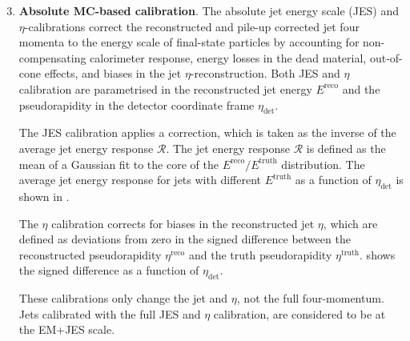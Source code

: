 \begin{enumerate}
	\setcounter{enumi}{2}
	\item \textbf{Absolute MC-based calibration}. The absolute jet energy scale (JES) and \(\eta\)-calibrations correct the reconstructed and pile-up corrected jet four momenta to the energy scale of final-state particles by accounting for non-compensating calorimeter response, energy losses in the dead material, out-of-cone effects, and biases in the jet \(\eta\)-reconstruction. Both JES and \(\eta\) calibration are parametrised in the reconstructed jet energy \(E^{\text{reco}}\) and the pseudorapidity in the detector coordinate frame \(\eta_{\text{det}}\).

	The JES calibration applies a correction, which is taken as the inverse of the average jet energy response \(\mathcal{R}\). The jet energy response \(\mathcal{R}\) is defined as the mean of a Gaussian fit to the core of the \(E^{\text{reco}} / E^{\text{truth}}\) distribution. The average jet energy response for jets with different \(E^{\text{truth}}\) as a function of \(\eta_{\text{det}}\) is shown in .

	The \(\eta\) calibration corrects for biases in the reconstructed jet \(\eta\), which are defined as deviations from zero in the signed difference between the reconstructed pseudorapidity \(\eta^{\text{reco}}\) and the truth pseudorapidity \(\eta^{\text{truth}}\).  shows the signed difference as a function of \(\eta_{\text{det}}\).

	These calibrations only change the jet \pt and \(\eta\), not the full four-momentum. Jets calibrated with the full JES and \(\eta\) calibration, are considered to be at the EM+JES scale.
\end{enumerate}
